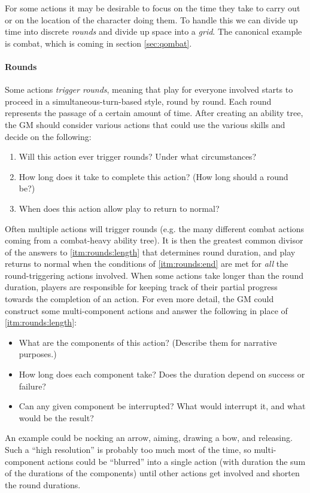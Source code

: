 \documentclass[12pt]{article}
\begin{document}
For some actions it may be desirable to focus on the time they take to carry out
or on the location of the character doing them.
To handle this we can divide up time into discrete \emph{rounds} and divide up space into a \emph{grid}.
The canonical example is combat, which is coming in section \ref{sec:qombat}.

\paragraph{Rounds}
Some actions \emph{trigger rounds},
meaning that play for everyone involved starts to proceed in a simultaneous-turn-based style,
round by round.
Each round represents the passage of a certain amount of time.
After creating an ability tree, the GM should consider various actions
that could use the various skills and decide on the following:
\vspace{-1em}
\begin{enumerate}
\item\label{itm:rounds:trigger}
Will this action ever trigger rounds? Under what circumstances?
\item\label{itm:rounds:length}
How long does it take to complete this action? (How long should a round be?)
\item\label{itm:rounds:end}
When does this action allow play to return to normal?
\end{enumerate}
Often multiple actions will trigger rounds 
(e.g. the many different combat actions coming from a combat-heavy ability tree).
It is then the greatest common divisor of the answers to \ref{itm:rounds:length} that determines round duration,
and play returns to normal when the conditions of \ref{itm:rounds:end} are met for \emph{all} the round-triggering actions involved.
When some actions take longer than the round duration, players are responsible for keeping track of their partial progress towards
the completion of an action.
For even more detail, the GM could construct some multi-component actions and answer the following in place of \ref{itm:rounds:length}:
\vspace{-1em}
\begin{itemize}
\item What are the components of this action? (Describe them for narrative purposes.)
\item How long does each component take? Does the duration depend on success or failure?
\item Can any given component be interrupted? What would interrupt it, and what would be the result?
\end{itemize}
An example could be nocking an arrow, aiming, drawing a bow, and releasing.
Such a ``high resolution'' is probably too much most of the time, so multi-component actions could be ``blurred'' into a single
action (with duration the sum of the durations of the components) until other actions get involved and shorten the round durations.
\end{document}
